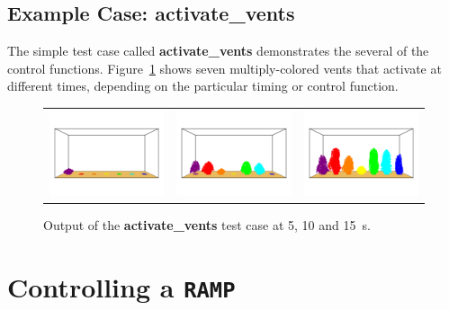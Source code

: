 \documentclass[11pt]{book}
\begin{document}
\subsection{Example Case: activate\_vents}

The simple test case called {\bf activate\_vents} demonstrates the several of the control functions. Figure~\ref{activate_vents} shows seven
multiply-colored vents that activate at different times, depending on the particular timing or control function.
\begin{figure}[ht]
\begin{tabular*}{\textwidth}{lll}
\includegraphics[width=2.05in]{SCRIPT_FIGURES/activate_vents_5} &
\includegraphics[width=2.05in]{SCRIPT_FIGURES/activate_vents_10} &
\includegraphics[width=2.05in]{SCRIPT_FIGURES/activate_vents_15}
\end{tabular*}
\caption[Example of a vent controls.]{Output of the {\bf activate\_vents} test case at 5, 10 and 15~s.}
\label{activate_vents}
\end{figure}




\section{Controlling a \texorpdfstring{{\tt RAMP}}{RAMP}}
\label{info:RAMPDEVC}
\end{document}
